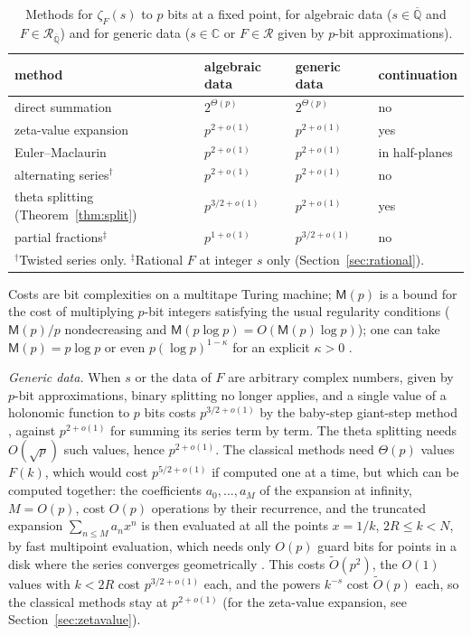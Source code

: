 \documentclass[11pt,reqno]{amsart}
\theoremstyle{definition}
\theoremstyle{remark}
\newcommand{\Qbar}{\overline{\mathbb{Q}}}
\newcommand{\Reg}{\mathcal{R}}
\newcommand{\RegQ}{\mathcal{R}_{\Qbar}}
\newcommand{\CC}{\mathbb{C}}
\newcommand{\Mul}{\mathsf{M}}
\begin{document}
\begin{table}[ht]
\centering\small
\caption{Methods for $\zeta_F(s)$ to $p$ bits at a fixed point, for algebraic data ($s \in \Qbar$ and
$F \in \RegQ$) and for generic data ($s \in \CC$ or $F \in \Reg$ given by $p$-bit approximations).}
\label{tab:methods}
\begin{tabular}{llll}
\toprule
method & algebraic data & generic data & continuation \\
\midrule
direct summation & $2^{\Theta(p)}$ & $2^{\Theta(p)}$ & no \\
zeta-value expansion & $p^{2+o(1)}$ & $p^{2+o(1)}$ & yes \\
Euler--Maclaurin & $p^{2+o(1)}$ & $p^{2+o(1)}$ & in half-planes \\
alternating series$^\dagger$ & $p^{2+o(1)}$ & $p^{2+o(1)}$ & no \\
theta splitting (Theorem~\ref{thm:split}) & $p^{3/2+o(1)}$ & $p^{2+o(1)}$ & yes \\
partial fractions$^\ddagger$ & $p^{1+o(1)}$ & $p^{3/2+o(1)}$ & no \\
\bottomrule
\multicolumn{4}{l}{\footnotesize ${}^\dagger$Twisted series only. ${}^\ddagger$Rational $F$ at integer $s$ only
(Section~\ref{sec:rational}).}
\end{tabular}
\end{table}

Costs are bit complexities on a multitape Turing machine; $\Mul(p)$ is a bound for the cost of multiplying
$p$-bit integers satisfying the usual regularity conditions ($\Mul(p)/p$ nondecreasing and
$\Mul(p\log p) = O(\Mul(p)\log p)$); one can take $\Mul(p) = p\log p$ \cite{HvdH21} or even
$p(\log p)^{1-\kappa}$ for an explicit $\kappa > 0$ \cite{OAI26}.

\emph{Generic data.} When $s$ or the data of $F$ are arbitrary complex numbers, given by $p$-bit approximations, binary
splitting no longer applies, and a single value of a holonomic function to $p$ bits costs $p^{3/2+o(1)}$ by the
baby-step giant-step method \cite{Bor87,CC90,BGS07}, against $p^{2+o(1)}$ for summing its series
term by term. The theta splitting needs $O(\sqrt p)$ such values, hence $p^{2+o(1)}$. The classical methods need
$\Theta(p)$ values $F(k)$, which would cost $p^{5/2+o(1)}$ if computed one at a time, but which can be computed
together: the coefficients $a_0, \dots, a_M$ of the expansion at infinity, $M = O(p)$, cost $O(p)$ operations by their
recurrence, and the truncated expansion $\sum_{n\le M}a_nx^n$ is then evaluated at all the points $x = 1/k$,
$2R \le k < N$, by fast multipoint evaluation, which needs only $O(p)$ guard bits for points in a disk where the
series converges geometrically \cite{KZ08,Mor21}. This costs $\widetilde O(p^2)$, the $O(1)$ values with $k < 2R$
cost $p^{3/2+o(1)}$ each, and the powers $k^{-s}$ cost $\widetilde O(p)$ each, so the classical methods stay at
$p^{2+o(1)}$ (for the zeta-value expansion, see Section~\ref{sec:zetavalue}).
\end{document}
